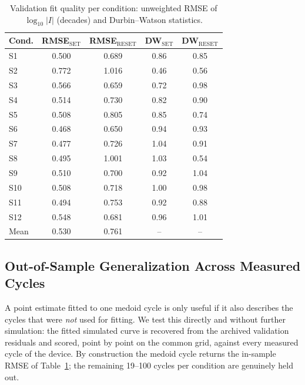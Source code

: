 \documentclass[journal]{IEEEtran}
\begin{document}
\begin{table}[!t]
\centering
\caption{Validation fit quality per condition: unweighted RMSE of
$\log_{10}|I|$ (decades) and Durbin--Watson statistics.}
\label{tab:fitquality}
\footnotesize
\begin{tabular}{@{}lcccc@{}}
\toprule
Cond. & RMSE$_{\mathrm{SET}}$ & RMSE$_{\mathrm{RESET}}$ &
DW$_{\mathrm{SET}}$ & DW$_{\mathrm{RESET}}$\\
\midrule
S1  & 0.500 & 0.689 & 0.86 & 0.85\\
S2  & 0.772 & 1.016 & 0.46 & 0.56\\
S3  & 0.566 & 0.659 & 0.72 & 0.98\\
S4  & 0.514 & 0.730 & 0.82 & 0.90\\
S5  & 0.508 & 0.805 & 0.85 & 0.74\\
S6  & 0.468 & 0.650 & 0.94 & 0.93\\
S7  & 0.477 & 0.726 & 1.04 & 0.91\\
S8  & 0.495 & 1.001 & 1.03 & 0.54\\
S9  & 0.510 & 0.700 & 0.92 & 1.04\\
S10 & 0.508 & 0.718 & 1.00 & 0.98\\
S11 & 0.494 & 0.753 & 0.92 & 0.88\\
S12 & 0.548 & 0.681 & 0.96 & 1.01\\
\midrule
Mean & 0.530 & 0.761 & -- & --\\
\bottomrule
\end{tabular}
\end{table}

\subsection{Out-of-Sample Generalization Across Measured Cycles}
\label{sec:res-heldout}

A point estimate fitted to one medoid cycle is only useful if it also
describes the cycles that were \emph{not} used for fitting.  We test this
directly and without further simulation: the fitted simulated curve is
recovered from the archived validation residuals and scored, point by point
on the common grid, against every measured cycle of the device.  By
construction the medoid cycle returns the in-sample RMSE of
Table~\ref{tab:fitquality}; the remaining 19--100 cycles per condition are
genuinely held out.
\end{document}
